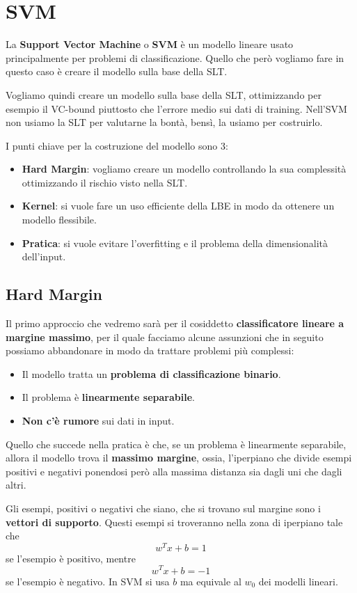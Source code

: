 \chapter{SVM}
La \textbf{Support Vector Machine} o \textbf{SVM} \`e un modello lineare usato principalmente per problemi di
classificazione. Quello che per\`o vogliamo fare in questo caso \`e creare il modello sulla base della SLT.

Vogliamo quindi creare un modello sulla base della SLT, ottimizzando per esempio il VC-bound piuttosto che l'errore medio
sui dati di training. Nell'SVM non usiamo la SLT per valutarne la bont\`a, bens\`i, la usiamo per costruirlo.

I punti chiave per la costruzione del modello sono 3:
\begin{itemize}
	\item \textbf{Hard Margin}: vogliamo creare un modello controllando la sua complessit\`a
	      ottimizzando il rischio visto nella SLT.
	\item \textbf{Kernel}: si vuole fare un uso efficiente della LBE in modo da ottenere un modello flessibile.
	\item \textbf{Pratica}: si vuole evitare l'overfitting e il problema della dimensionalit\`a dell'input.
\end{itemize}

\section{Hard Margin}
Il primo approccio che vedremo sar\`a per il cosiddetto \textbf{classificatore lineare a margine massimo}, per il quale
facciamo alcune assunzioni che in seguito possiamo abbandonare in modo da trattare problemi pi\`u complessi:
\begin{itemize}
	\item Il modello tratta un \textbf{problema di classificazione binario}.
	\item Il problema \`e \textbf{linearmente separabile}.
	\item \textbf{Non c'\`e rumore} sui dati in input.
\end{itemize}
Quello che succede nella pratica \`e che, se un problema \`e linearmente separabile, allora il modello trova il
\textbf{massimo margine}, ossia, l'iperpiano che divide esempi positivi e negativi ponendosi per\`o alla massima distanza
sia dagli uni che dagli altri.

Gli esempi, positivi o negativi che siano, che si trovano sul margine sono i \textbf{vettori di supporto}. Questi esempi si
troveranno nella zona di iperpiano tale che
\[ w^T x + b = 1 \]
se l'esempio \`e positivo, mentre
\[ w^T x + b = -1 \]
se l'esempio \`e negativo. In SVM si usa $b$ ma equivale al $w_0$ dei modelli lineari.


